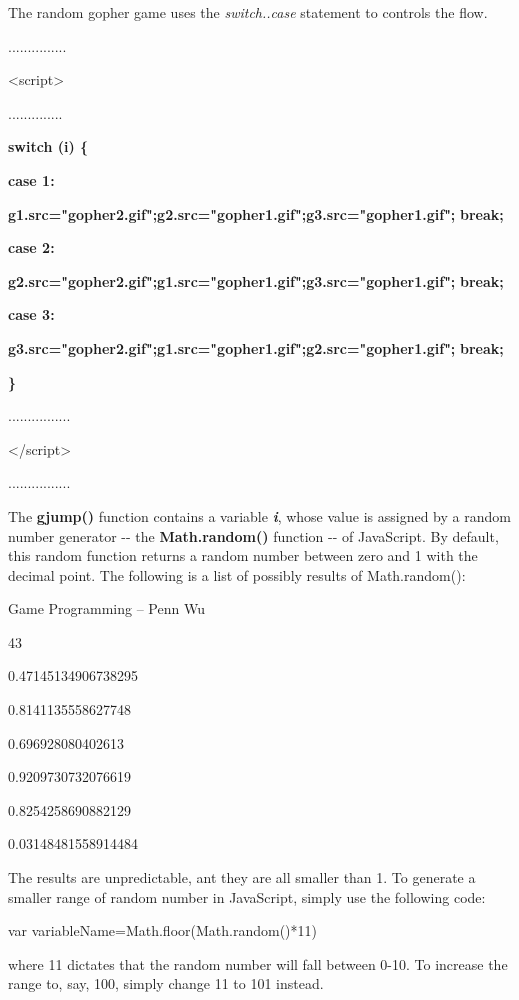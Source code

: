 \documentclass[
]{article}
\begin{document}
The random gopher game uses the \emph{switch..case} statement to
controls the flow.

...............

\textless script\textgreater{}

..............

\textbf{}

\textbf{switch (i) \{}

\textbf{case 1:}

\textbf{g1.src="gopher2.gif";g2.src="gopher1.gif";g3.src="gopher1.gif";}
\textbf{break;}

\textbf{}

\textbf{case 2:}

\textbf{g2.src="gopher2.gif";g1.src="gopher1.gif";g3.src="gopher1.gif";}
\textbf{break;}

\textbf{}

\textbf{case 3:}

\textbf{g3.src="gopher2.gif";g1.src="gopher1.gif";g2.src="gopher1.gif";}
\textbf{break;}

\textbf{\}}

................

\textless/script\textgreater{}

................

The \textbf{gjump()} function contains a variable \emph{\textbf{i}},
whose value is assigned by a random number generator -\/- the
\textbf{Math.random()} function -\/- of JavaScript. By default, this
random function returns a random number between zero and 1 with the
decimal point. The following is a list of possibly results of
Math.random():

Game Programming -- Penn Wu

43

\protect\hypertarget{index_split_004.htmlux5cux23p44}{}{}

0.47145134906738295

0.8141135558627748

0.696928080402613

0.9209730732076619

0.8254258690882129

0.03148481558914484

The results are unpredictable, ant they are all smaller than 1. To
generate a smaller range of random number in JavaScript, simply use the
following code:

var variableName=Math.floor(Math.random()*11)

where 11 dictates that the random number will fall between 0-10. To
increase the range to, say, 100, simply change 11 to 101 instead.
\end{document}
